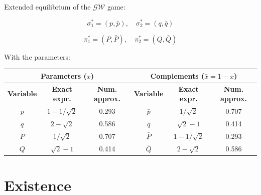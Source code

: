 \documentclass{beamer}
\theoremstyle{definition}
\begin{document}
\begin{frame}{}

Extended equilibrium of the $\mathcal{GW}$ game:

\begin{equation}
    \sigma_1^* = (p, \bar{p}), \quad
    \sigma_2^* = (q, \bar{q})
\end{equation}

\begin{equation}
    \pi_1^* = (P, \bar{P}), \quad
    \pi_2^* = (Q, \bar{Q})
\end{equation}

With the parameters:
\begin{table}[H]
    \centering
    \tiny
    \renewcommand{\arraystretch}{1.5}
    \begin{tabular}{|c|c|c||c|c|c|}
        \hline
        \multicolumn{3}{|c||}{\textbf{Parameters ($x$)}} & \multicolumn{3}{c|}{\textbf{Complements ($\bar{x} = 1-x$)}} \\
        \hline
        \textbf{Variable} & \textbf{Exact expr.} & \textbf{Num. approx.} & \textbf{Variable} & \textbf{Exact expr.} & \textbf{Num. approx.} \\
        \hline
        $p$ & $1-1/\sqrt{2}$ & 0.293 & $\bar{p}$ & $1/\sqrt{2}$ & 0.707 \\
        \hline
        $q$ & $2-\sqrt{2}$ & 0.586 & $\bar{q}$ & $\sqrt{2} - 1$ & 0.414 \\
        \hline
        $P$ & $1/\sqrt{2}$ & 0.707 & $\bar{P}$ & $1-1/\sqrt{2}$ & 0.293 \\
        \hline
        $Q$ & $\sqrt{2} - 1$ & 0.414 & $\bar{Q}$ & $2-\sqrt{2}$ & 0.586 \\
        \hline
    \end{tabular}
    \label{tab:variables}
\end{table}

\end{frame}

\section{Existence}
\end{document}
